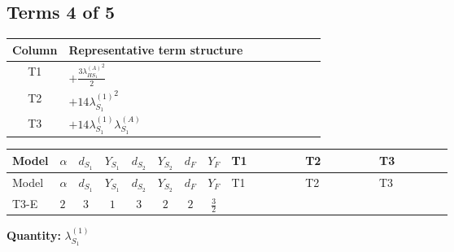 \documentclass[8pt]{article}
\begin{document}
\begin{landscape}
\subsection*{Terms 4 of 5}
\begin{center}
\begin{tabular}{@{}c >{\raggedright\arraybackslash}p{0.82\linewidth}@{}}
\toprule
Column & Representative term structure \\
\midrule
T1 & \(\displaystyle +\frac{3 {\lambda_{HS_1}^{(A)}}^2}{2}\) \\
\midrule
T2 & \(\displaystyle +14 {\lambda_{S_1}^{(1)}}^2\) \\
\midrule
T3 & \(\displaystyle +14 {\lambda_{S_1}^{(1)}} {\lambda_{S_1}^{(A)}}\) \\
\midrule
\bottomrule
\end{tabular}
\end{center}
\smallskip
\tiny
\begin{longtable}{@{}llcccccc >{\raggedright\arraybackslash}p{0.21\linewidth} >{\raggedright\arraybackslash}p{0.21\linewidth} >{\raggedright\arraybackslash}p{0.21\linewidth}@{}}
\toprule
Model & $\alpha$ & $d_{S_1}$ & $Y_{S_1}$ & $d_{S_2}$ & $Y_{S_2}$ & $d_F$ & $Y_F$ & T1 & T2 & T3 \\
\midrule
\endfirsthead
\toprule
Model & $\alpha$ & $d_{S_1}$ & $Y_{S_1}$ & $d_{S_2}$ & $Y_{S_2}$ & $d_F$ & $Y_F$ & T1 & T2 & T3 \\
\midrule
\endhead
T3-E & $2$ & $3$ & $1$ & $3$ & $2$ & $2$ & $\frac{3}{2}$ & \scriptsize\adjustbox{max width=\linewidth}{$\begin{gathered} +\frac{3 {\lambda_{HS_1}^{(A)}}^2}{2}\end{gathered}$} & \scriptsize\adjustbox{max width=\linewidth}{$\begin{gathered} +14 {\lambda_{S_1}^{(1)}}^2\end{gathered}$} & \scriptsize\adjustbox{max width=\linewidth}{$\begin{gathered} +14 {\lambda_{S_1}^{(1)}} {\lambda_{S_1}^{(A)}}\end{gathered}$} \\
\midrule
\bottomrule
\end{longtable}
\clearpage
\noindent\textbf{Quantity: }$\lambda_{S_1}^{(1)}$\par\smallskip

\end{landscape}
\end{document}
